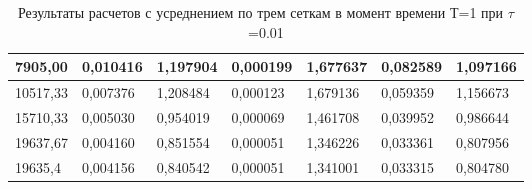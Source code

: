 \documentclass[14pt]{article}
\begin{document}
\begin{table}[]
\begin{tabular}{|l|l|l|l|l|l|l|}
7905,00  & 0,010416 & 1,197904               & 0,000199 & 1,677637 & 0,082589 & 1,097166               \\ \hline
10517,33 & 0,007376 & 1,208484               & 0,000123 & 1,679136 & 0,059359 & 1,156673               \\ \hline
15710,33 & 0,005030 & 0,954019               & 0,000069 & 1,461708 & 0,039952 & 0,986644               \\ \hline
19637,67 & 0,004160 & 0,851554               & 0,000051 & 1,346226 & 0,033361 & 0,807956               \\ \hline
19635,4  & 0,004156 & 0,840542               & 0,000051 & 1,341001 & 0,033315 & 0,804780               \\ \hline
\end{tabular}
\caption{Результаты расчетов с усреднением по трем сеткам в момент времени Т=1 при $\tau$=0.01}
\end{table}
\newpage
\end{document}
